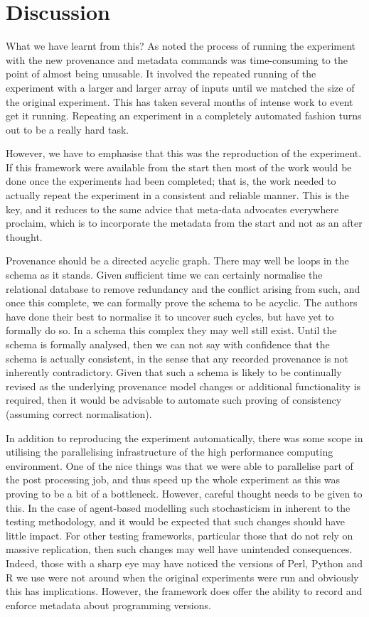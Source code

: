 \documentclass[runningheads]{llncs}
\begin{document}
\normalsize

\section{Discussion}

What we have learnt from this?  As noted the process of running the experiment
with the new provenance and metadata commands was time-consuming to the point
of almost being unusable. It involved the repeated running of the experiment
with a larger and larger array of inputs until we matched the size of the
original experiment.  This has taken several months of intense work to event get it running. Repeating an experiment in a completely automated fashion turns out to be a really hard task. 

However, we have to emphasise that this was the reproduction of the experiment.
If this framework were available from the start then most of the work would be
done once the experiments had been completed; that is, the work needed to
actually repeat the experiment in a consistent and reliable manner. This is the
key, and it reduces to the same advice that meta-data advocates everywhere
proclaim, which is to incorporate the metadata from the start and not as an
after thought.

Provenance should be a directed acyclic graph. There may well be loops in the
schema as it stands. Given sufficient time we can certainly normalise the
relational database to remove redundancy and the conflict arising from such,
and once this complete,  we can formally prove the schema to be acyclic.  The
authors have done their best to normalise it to uncover such cycles, but have
yet to formally do so. In a schema this complex they may well still exist.
Until the schema is formally analysed, then we can not say with confidence that
the schema is actually consistent, in the sense that any recorded provenance is
not inherently contradictory. Given that such a schema is likely to be
continually revised as the underlying provenance model changes or additional
functionality is required, then it would be advisable to automate such proving
of consistency (assuming correct normalisation).

In addition to reproducing the experiment automatically, there was some scope
in utilising the parallelising infrastructure of the high performance computing
environment.  One of the nice things was that we were able to parallelise part
of the post processing job, and thus speed up the whole experiment as this was
proving to be a bit of a bottleneck. However, careful thought needs to be given
to this. In the case of agent-based modelling such stochasticism in inherent to
the testing methodology, and it would be expected that such changes should have
little impact. For other testing frameworks, particular those that do not rely
on massive replication, then such changes may well have unintended
consequences.  Indeed, those with a sharp eye may have noticed the versions of
Perl, Python and R we use were not around when the original experiments were
run and obviously this has implications. However, the framework does offer the
ability to record and enforce metadata about programming versions.
\end{document}
